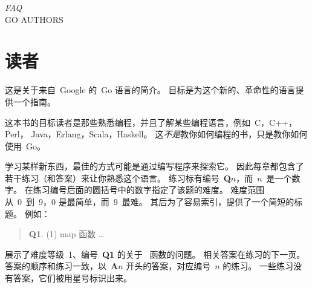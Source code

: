 {\textit{FAQ}\\ \textsc{GO AUTHORS}}

\section{读者}
\noindent{}这是关于来自~Google 的~Go 语言的简介。
目标是为这个新的、革命性的语言提供一个指南。

这本书的目标读者是那些熟悉编程，并且了解某些编程语言，例如~C\cite{c}，C++\cite{c++}，\\ 
Perl\cite{perl}， Java\cite{java}，Erlang\cite{erlang}，Scala\cite{scala}，Haskell\cite{haskell}。
这\emph{不是}教你如何编程的书，只是教你如何使用~Go。

学习某样新东西，最佳的方式可能是通过编写程序来探索它。
因此每章都包含了若干练习（和答案）来让你熟悉这个语言。
练习标有编号~\textbf{Q$n$}，而~$n$~是一个数字。 
在练习编号后面的圆括号中的数字指定了该题的难度。
难度范围从~0~到~9，0 是最简单，而~9~最难。
其后为了容易索引，提供了一个简短的标题。
例如：
\begin{verse}
\textbf{Q1}. (1) map 函数 \ldots
\end{verse}
展示了难度等级~1、编号~\textbf{Q1} 的关于~ 函数的问题。
相关答案在练习的下一页。
答案的顺序和练习一致，以~\textbf{A$n$} 开头的答案，对应编号~$n$ 的练习。
一些练习没有答案，它们被用星号标识出来。

